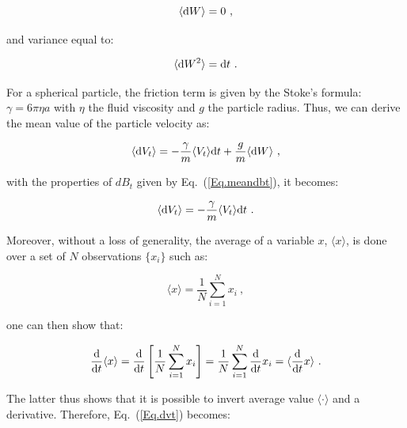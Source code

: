 \begin{equation}
	\langle \textnormal{d}W \rangle  = 0~,
	\label{Eq.meandbt}
\end{equation}

and variance equal to: 

\begin{equation}
	\langle \textnormal{d}W ^2 \rangle = \textnormal{d}t~.
	\label{Eq.meandbt2}
\end{equation}

For a spherical particle, the friction term is given by the Stoke's formula: $\gamma = 6\pi \eta a$ with $\eta$ the fluid viscosity and $g$ the particle radius. Thus, we can derive the mean value of the particle velocity as:


\begin{equation}
	\left\langle   \textnormal{d}V_t \right\rangle = - \frac{\gamma}{m} \langle V_t \rangle \textnormal{d}t  + \frac{g}{m} \langle  \textnormal{d}W \rangle ~,
	\label{Eq.langevinsd}
\end{equation}

with the properties of $dB_t$ given by Eq.~(\ref{Eq.meandbt}), it becomes:

\begin{equation}
	\langle  \textnormal{d}V_t \rangle = - \frac{\gamma}{m} \langle V_t \rangle \textnormal{d}t ~.
	\label{Eq.dvt}
\end{equation}

Moreover, without a loss of generality, the average of a variable $x$, $\langle x \rangle$, is done over a set of $N$ observations $\{x_i\}$ such as:

\begin{equation}
	\langle x \rangle = \frac{1}{N} \sum _{i=1}^N x_i ~,
\end{equation}

one can then show that:

\begin{equation}
	\frac{\textnormal{d}}{\textnormal{d}t}\langle x \rangle = \frac{\textnormal{d}}{ \textnormal{d}t} \left[\frac{1}{N} \sum _{i=1}^N x_i \right] = 
	\frac{1}{N} \sum _{i=1}^N \frac{\textnormal{d}}{ \textnormal{d}t} x_i = \langle\frac{\textnormal{d}}{\textnormal{d}t} x \rangle ~.
\end{equation}

The latter thus shows that it is possible to invert average value $\langle \cdot \rangle$ and a derivative. Therefore, Eq.~(\ref{Eq.dvt}) becomes:


